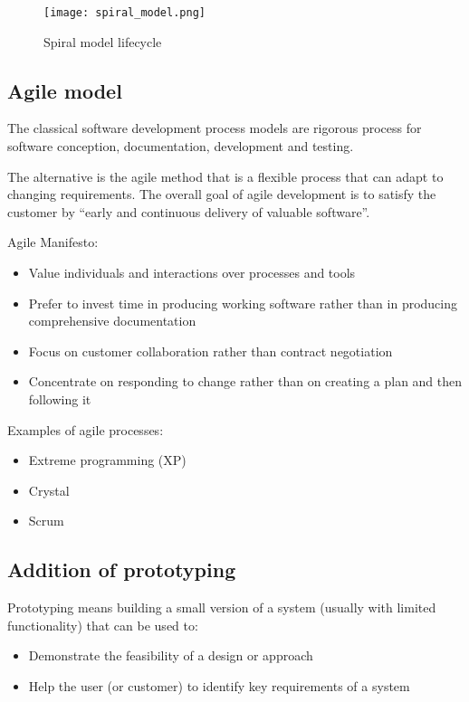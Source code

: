 \begin{figure}[!ht]
    \centering
    \texttt{[image: spiral\_model.png]}
    \caption{Spiral model lifecycle}
\end{figure}

\subsection{Agile model}

The classical software development process models are rigorous process for
software conception, documentation, development and testing.

The alternative is the agile method that is a flexible process that can adapt to
changing requirements. The overall goal of agile development is to satisfy the
customer by \enquote{early and continuous delivery of valuable software}.

Agile Manifesto:

\begin{itemize}
    \item Value individuals and interactions over processes and tools
    \item Prefer to invest time in producing working software rather than in producing comprehensive documentation
    \item Focus on customer collaboration rather than contract negotiation
    \item Concentrate on responding to change rather than on creating a plan and then following it
\end{itemize}


Examples of agile processes:

\begin{itemize}
    \item Extreme programming (XP)
    \item Crystal
    \item Scrum
\end{itemize}

\subsection{Addition of prototyping}

Prototyping means building a small version of a system (usually with limited
functionality) that can be used to:

\begin{itemize}
    \item Demonstrate the feasibility of a design or approach
    \item Help the user (or customer) to identify key requirements of a system
\end{itemize}


